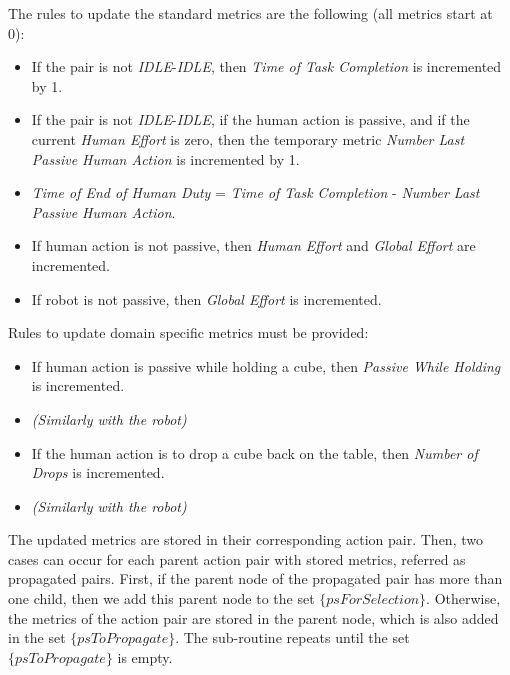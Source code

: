 The rules to update the standard metrics are the following (all metrics start at 0):
\vspace{-\topsep}
\begin{itemize}
    \setlength\itemsep{-0.3em}
    \item If the pair is not \textit{IDLE}-\textit{IDLE}, then \textit{Time of Task Completion} is incremented by 1.
    \item If the pair is not \textit{IDLE}-\textit{IDLE}, if the human action is passive, and if the current \textit{Human Effort} is zero, then the temporary metric \textit{Number Last Passive Human Action} is incremented by 1.
    \item \textit{Time of End of Human Duty} = \textit{Time of Task Completion} - \textit{Number Last Passive Human Action}.
    \item If human action is not passive, then \textit{Human Effort} and \textit{Global Effort} are incremented.
    \item If robot is not passive, then \textit{Global Effort} is incremented.
\end{itemize}
Rules to update domain specific metrics must be provided:
\vspace{-\topsep}
\begin{itemize}
    \setlength\itemsep{-0.3em}
    \item If human action is passive while holding a cube, then \textit{Passive While Holding} is incremented.
    \item \textit{(Similarly with the robot)}
    \item If the human action is to drop a cube back on the table, then \textit{Number of Drops} is incremented.
    \item \textit{(Similarly with the robot)}
\end{itemize}

The updated metrics are stored in their corresponding action pair. Then, two cases can occur for each parent action pair with stored metrics, referred as propagated pairs. First, if the parent node of the propagated pair has more than one child, then we add this parent node to the set $\{psForSelection\}$. Otherwise, the metrics of the action pair are stored in the parent node, which is also added in the set $\{psToPropagate\}$. 
The sub-routine repeats until the set $\{psToPropagate\}$ is empty.

